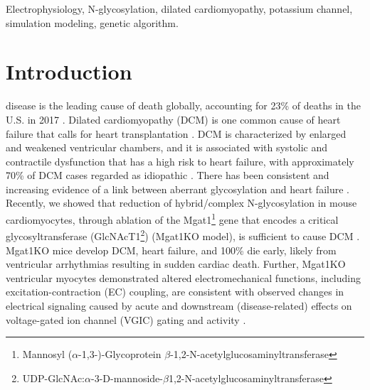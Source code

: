 \documentclass[journal]{IEEEtran}
\begin{document}
\begin{IEEEkeywords}
Electrophysiology, N-glycosylation, dilated cardiomyopathy, potassium channel, simulation modeling, genetic algorithm. 
\end{IEEEkeywords}

%
\IEEEpeerreviewmaketitle

\section{Introduction}
 disease is the leading cause of death globally, accounting for 23\% of deaths in the U.S. in 2017 \cite{cdc2019deaths}. Dilated cardiomyopathy (DCM) is one common cause of heart failure that calls for heart transplantation \cite{weintraub2017dilated}. DCM is characterized by enlarged and weakened ventricular chambers, and it is associated with systolic and contractile dysfunction that has a high risk to heart failure, with approximately 70\% of DCM cases regarded as idiopathic \cite{weintraub2017dilated, lakdawala2013dilated, hershberger2011update}. There has been consistent and increasing evidence of a link between aberrant glycosylation and heart failure \cite{gehrmann2003cardiomyopathy, footitt2009cardiomyopathy, marques2017cardiac}. Recently, we showed that reduction of hybrid/complex N-glycosylation in mouse cardiomyocytes, through ablation of the Mgat1\footnote{Mannosyl ($\alpha$-1,3-)-Glycoprotein $\beta$-1,2-N-acetylglucosaminyltransferase} gene that encodes a critical glycosyltransferase (GlcNAcT1\footnote{UDP-GlcNAc:$\alpha$-3-D-mannoside-$\beta$1,2-N-acetylglucosaminyltransferase}) (Mgat1KO model), is sufficient to cause DCM \cite{ednie2019reduced, ednie2019reduced2}. Mgat1KO mice develop DCM, heart failure, and 100\% die early, likely from ventricular arrhythmias resulting in sudden cardiac death. Further, Mgat1KO ventricular myocytes demonstrated altered electromechanical functions, including excitation-contraction (EC) coupling, are consistent with observed changes in electrical signaling caused by acute and downstream (disease-related) effects on voltage-gated ion channel (VGIC) gating and activity \cite{ednie2019reduced}. 
\end{document}
